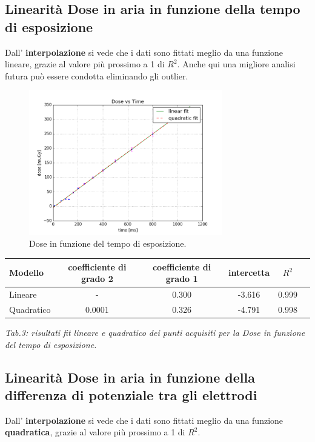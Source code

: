 \documentclass[a4paper]{article}
\begin{document}
\subsection{Linearità Dose in aria in funzione della tempo di esposizione}
Dall' \textbf{interpolazione} si vede che i dati sono fittati meglio da una funzione lineare, grazie al valore più prossimo a 1 di $R^{2}$. Anche qui una migliore analisi futura può essere condotta eliminando gli outlier.
\begin{figure}[H]
\centering
\includegraphics[width=0.75\textwidth]{dosevstime.png}
\caption{Dose in funzione del tempo di esposizione.}
\end{figure}

\begin{center} 
		
		\begin{tabular}{lccccc}
			\hline
			\hline
			\textbf{Modello}	& \textbf{coefficiente di grado 2}& \textbf{coefficiente di grado 1}& \textbf{intercetta}&  \textbf{$R^{2}$} 	 \\
			\hline
			\hline
			Lineare	&-&0.300&-3.616&0.999	\\
			Quadratico	&0.0001&0.326&-4.791&0.998\\
			
			
			\hline
			\hline
		\end{tabular}
		\linebreak
		\emph{Tab.3: risultati fit lineare e quadratico dei punti acquisiti per la Dose in funzione del tempo di esposizione.} 
	\end{center}
\subsection{Linearità Dose in aria in funzione della differenza di potenziale tra gli elettrodi}
Dall' \textbf{interpolazione} si vede che i dati sono fittati meglio da una funzione \textbf{quadratica}, grazie al valore più prossimo a 1 di $R^{2}$. 
\end{document}
